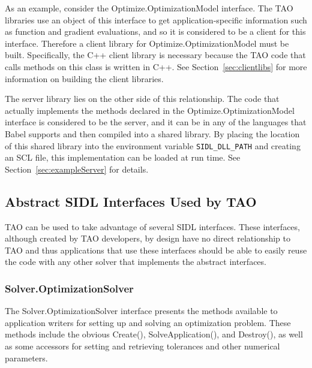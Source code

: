 \documentclass[doublespacing,12pt]{article}
\begin{document}
As an example, consider the \textsf{Optimize.Op\-ti\-mi\-za\-tion\-Mod\-el} interface.  The TAO libraries use an object of this
interface to get application-specific information such as function and gradient
evaluations, and so it is considered to be a client for this interface.  
Therefore 
a client library for \textsf{Optimize.Op\-ti\-mi\-za\-tion\-Mod\-el} must be built. Specifically, 
the C++ client library is necessary because the TAO 
code that calls methods on this class is written in C++.
See Section~\ref{sec:clientlibs} for more information on building the client 
libraries.

The server library lies on the other side of this relationship.  The code that
actually implements the methods declared in the \textsf{Optimize.Op\-ti\-mi\-za\-tion\-Mod\-el} 
interface is considered to be the server, and it can be in any of the 
languages that Babel supports and then compiled
into a shared library.  By 
placing the location of this shared library into the environment variable
\texttt{SIDL\_DLL\_PATH} and creating an SCL file, this implementation
can be loaded at run time.  See Section~\ref{sec:exampleServer} for details.


\subsection{Abstract SIDL Interfaces Used by TAO}
TAO can be used to take advantage of several SIDL interfaces.  These
interfaces, although created by TAO developers, by design have no
direct relationship to TAO and thus applications that use these
interfaces should be able to easily reuse the code with any
other solver that implements the abstract interfaces.

\subsubsection{Solver.OptimizationSolver}
The \textsf{Sol\-ver.Op\-ti\-mi\-za\-tion\-Sol\-ver} interface  presents the methods
available to application writers for setting up and solving an
optimization problem.  These methods include the obvious \textsf{Create()}, 
\textsf{SolveApplication()}, and \textsf{Destroy()}, as well as some 
accessors for setting and retrieving tolerances and other numerical
parameters.   
\end{document}
